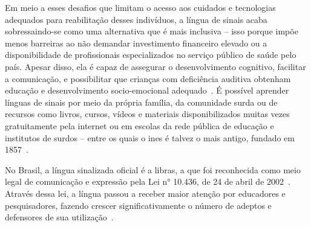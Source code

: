 Em meio a esses desafios que limitam o acesso aos cuidados e tecnologias adequados para reabilitação desses indivíduos, a língua de sinais acaba sobressaindo-se como uma alternativa que é mais inclusiva -- isso porque impõe menos barreiras ao não demandar investimento financeiro elevado ou a disponibilidade de profissionais especializados no serviço público de saúde pelo país. Apesar disso, ela é capaz de assegurar o desenvolvimento cognitivo, facilitar a comunicação, e possibilitar que crianças com deficiência auditiva obtenham educação e desenvolvimento socio-emocional adequado~\cite{who-2021-report-hearing}. %
É possível aprender línguas de sinais por meio da própria família, da comunidade surda ou de recursos como livros, cursos, vídeos e materiais disponibilizados muitas vezes gratuitamente pela internet ou em escolas da rede pública de educação e institutos de surdos -- entre os quais o \acrfull{ines} é talvez o mais antigo, fundado em 1857~\cite{pereira-2011-conhecimento-alem-sinais}. 



No Brasil, a língua sinalizada oficial é a \acrfull{libras}, a que foi reconhecida como meio legal de comunicação e expressão pela Lei n° 10.436, de 24 de abril de 2002~\cite{brasil-2002-lei10436}. Através dessa lei, a língua passou a receber maior atenção por educadores e pesquisadores, fazendo crescer significativamente o número de adeptos e defensores de sua utilização~\cite{pereira-2011-conhecimento-alem-sinais}.

